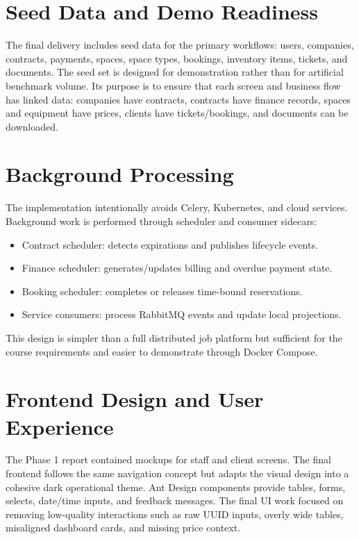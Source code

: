 \documentclass[12pt,a4paper]{report}
\begin{document}
\section{Seed Data and Demo Readiness}
\label{sec:seed-data}

The final delivery includes seed data for the primary workflows: users,
companies, contracts, payments, spaces, space types, bookings, inventory items,
tickets, and documents. The seed set is designed for demonstration rather than
for artificial benchmark volume. Its purpose is to ensure that each screen and
business flow has linked data: companies have contracts, contracts have finance
records, spaces and equipment have prices, clients have tickets/bookings, and
documents can be downloaded.

\section{Background Processing}
\label{sec:background-processing}

The implementation intentionally avoids Celery, Kubernetes, and cloud services.
Background work is performed through scheduler and consumer sidecars:
\begin{itemize}
  \item Contract scheduler: detects expirations and publishes lifecycle events.
  \item Finance scheduler: generates/updates billing and overdue payment state.
  \item Booking scheduler: completes or releases time-bound reservations.
  \item Service consumers: process RabbitMQ events and update local projections.
\end{itemize}

This design is simpler than a full distributed job platform but sufficient for
the course requirements and easier to demonstrate through Docker Compose.

\section{Frontend Design and User Experience}
\label{sec:frontend-design}

The Phase 1 report contained mockups for staff and client screens. The final
frontend follows the same navigation concept but adapts the visual design into a
cohesive dark operational theme. Ant Design components provide tables, forms,
selects, date/time inputs, and feedback messages. The final UI work focused on
removing low-quality interactions such as raw UUID inputs, overly wide tables,
misaligned dashboard cards, and missing price context.
\end{document}
